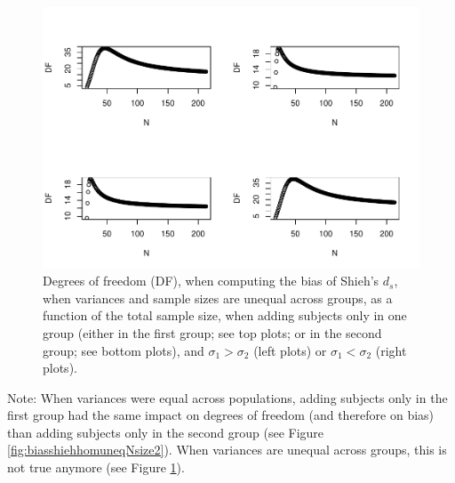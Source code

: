 \documentclass[
  english,
  man]{apa6}
\begin{document}
\begin{figure}
\centering
\includegraphics{Theoretical-Bias-of-all-estimators-as-a-function-of-population-parameters_files/figure-latex/biasshiehhetuneqNsize2-1.pdf}
\caption{\label{fig:biasshiehhetuneqNsize2}Degrees of freedom (DF), when computing the bias of Shieh's \(d_s\), when variances and sample sizes are unequal across groups, as a function of the total sample size, when adding subjects only in one group (either in the first group; see top plots; or in the second group; see bottom plots), and \(\sigma_1 > \sigma_2\) (left plots) or \(\sigma_1 < \sigma_2\) (right plots).}
\end{figure}

Note: When variances were equal across populations, adding subjects only in the first group had the same impact on degrees of freedom (and therefore on bias) than adding subjects only in the second group (see Figure \ref{fig:biasshiehhomuneqNsize2}). When variances are unequal across groups, this is not true anymore (see Figure \ref{fig:biasshiehhetuneqNsize2}).
\end{document}
